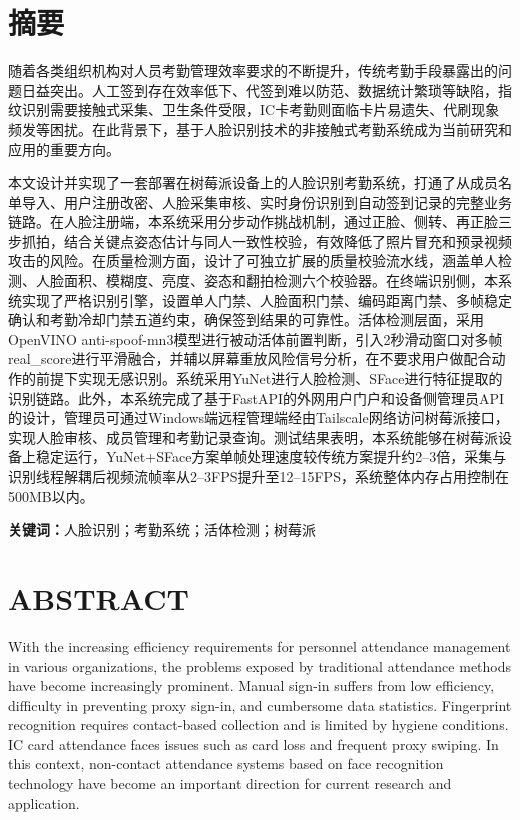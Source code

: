 \documentclass{heuthesis}
\begin{document}
\makeCover

\cleardoublepage
\section*{\centering{}摘\quad 要}

随着各类组织机构对人员考勤管理效率要求的不断提升，传统考勤手段暴露出的问题日益突出。人工签到存在效率低下、代签到难以防范、数据统计繁琐等缺陷，指纹识别需要接触式采集、卫生条件受限，IC卡考勤则面临卡片易遗失、代刷现象频发等困扰。在此背景下，基于人脸识别技术的非接触式考勤系统成为当前研究和应用的重要方向。

本文设计并实现了一套部署在树莓派设备上的人脸识别考勤系统，打通了从成员名单导入、用户注册改密、人脸采集审核、实时身份识别到自动签到记录的完整业务链路。在人脸注册端，本系统采用分步动作挑战机制，通过正脸、侧转、再正脸三步抓拍，结合关键点姿态估计与同人一致性校验，有效降低了照片冒充和预录视频攻击的风险。在质量检测方面，设计了可独立扩展的质量校验流水线，涵盖单人检测、人脸面积、模糊度、亮度、姿态和翻拍检测六个校验器。在终端识别侧，本系统实现了严格识别引擎，设置单人门禁、人脸面积门禁、编码距离门禁、多帧稳定确认和考勤冷却门禁五道约束，确保签到结果的可靠性。活体检测层面，采用OpenVINO anti-spoof-mn3模型进行被动活体前置判断，引入2秒滑动窗口对多帧real\_score进行平滑融合，并辅以屏幕重放风险信号分析，在不要求用户做配合动作的前提下实现无感识别。系统采用YuNet进行人脸检测、SFace进行特征提取的识别链路。此外，本系统完成了基于FastAPI的外网用户门户和设备侧管理员API的设计，管理员可通过Windows端远程管理端经由Tailscale网络访问树莓派接口，实现人脸审核、成员管理和考勤记录查询。测试结果表明，本系统能够在树莓派设备上稳定运行，YuNet+SFace方案单帧处理速度较传统方案提升约2--3倍，采集与识别线程解耦后视频流帧率从2--3FPS提升至12--15FPS，系统整体内存占用控制在500MB以内。

\medskip
\noindent\textbf{关键词：}人脸识别；考勤系统；活体检测；树莓派

\cleardoublepage
\section*{\centering{}ABSTRACT}

With the increasing efficiency requirements for personnel attendance management in various organizations, the problems exposed by traditional attendance methods have become increasingly prominent. Manual sign-in suffers from low efficiency, difficulty in preventing proxy sign-in, and cumbersome data statistics. Fingerprint recognition requires contact-based collection and is limited by hygiene conditions. IC card attendance faces issues such as card loss and frequent proxy swiping. In this context, non-contact attendance systems based on face recognition technology have become an important direction for current research and application.
\end{document}
